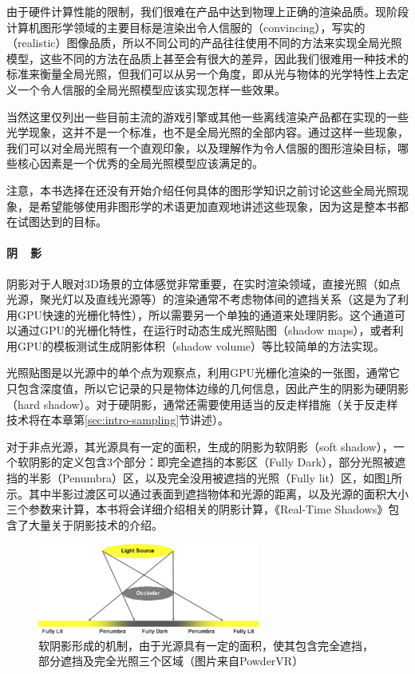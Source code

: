 由于硬件计算性能的限制，我们很难在产品中达到物理上正确的渲染品质。现阶段计算机图形学领域的主要目标是渲染出令人信服的（convincing），写实的（realistic）图像品质，所以不同公司的产品往往使用不同的方法来实现全局光照模型，这些不同的方法在品质上甚至会有很大的差异，因此我们很难用一种技术的标准来衡量全局光照，但我们可以从另一个角度，即从光与物体的光学特性上去定义一个令人信服的全局光照模型应该实现怎样一些效果。

当然这里仅列出一些目前主流的游戏引擎或其他一些离线渲染产品都在实现的一些光学现象，这并不是一个标准，也不是全局光照的全部内容。通过这样一些现象，我们可以对全局光照有一个直观印象，以及理解作为令人信服的图形渲染目标，哪些核心因素是一个优秀的全局光照模型应该满足的。

注意，本书选择在还没有开始介绍任何具体的图形学知识之前讨论这些全局光照现象，是希望能够使用非图形学的术语更加直观地讲述这些现象，因为这是整本书都在试图达到的目标。



\paragraph{阴~~影}
阴影对于人眼对3D场景的立体感觉非常重要，在实时渲染领域，直接光照（如点光源，聚光灯以及直线光源等）的渲染通常不考虑物体间的遮挡关系（这是为了利用GPU快速的光栅化特性），所以需要另一个单独的通道来处理阴影。这个通道可以通过GPU的光栅化特性，在运行时动态生成光照贴图（shadow maps），或者利用GPU的模板测试生成阴影体积（shadow volume）等比较简单的方法实现。

光照贴图是以光源中的单个点为观察点，利用GPU光栅化渲染的一张图，通常它只包含深度值，所以它记录的只是物体边缘的几何信息，因此产生的阴影为硬阴影（hard shadow）。对于硬阴影，通常还需要使用适当的反走样措施（关于反走样技术将在本章第\ref{sec:intro-sampling}节讲述）。

对于非点光源，其光源具有一定的面积，生成的阴影为软阴影（soft shadow），一个软阴影的定义包含3个部分：即完全遮挡的本影区（Fully Dark），部分光照被遮挡的半影（Penumbra）区，以及完全没用被遮挡的光照（Fully lit）区，如图\ref{f:intro-shadow}所示。其中半影过渡区可以通过表面到遮挡物体和光源的距离，以及光源的面积大小三个参数来计算，本书将会详细介绍相关的阴影计算，《Real-Time Shadows》\cite{b:rts}包含了大量关于阴影技术的介绍。

\begin{figure}
\sidecaption
	\includegraphics[width=0.65\textwidth]{figures/intro/shadow}
	\caption{软阴影形成的机制，由于光源具有一定的面积，使其包含完全遮挡，部分遮挡及完全光照三个区域（图片来自PowderVR）}
	\label{f:intro-shadow}
\end{figure}




